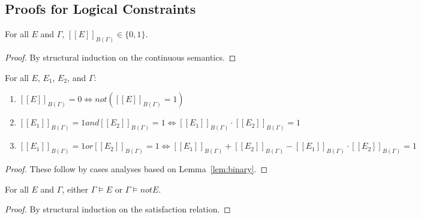 \documentclass[acmsmall,nonacm]{acmart}\settopmatter{printfolios=true,printccs=false,printacmref=false}
\newcommand{\qqpi}[2]{[\![#2]\!]_{#1}}
\begin{document}
\subsection{Proofs for Logical Constraints}


\begin{lemma} \label{lem:binary}
    For all $E$ and $\Gamma$, $\qqpi{B(\Gamma)}{E} \in \{0,1\}$.
\end{lemma}

\begin{proof} %
    By structural induction on the continuous semantics.
\end{proof}


\begin{lemma}
For all $E$, $E_1$, $E_2$, and $\Gamma$:
\begin{enumerate}
    \item $\qqpi{B(\Gamma)}{E} = 0 \Leftrightarrow{} not (\qqpi{B(\Gamma)}{E} = 1)$
    \item $\qqpi{B(\Gamma)}{E_1} = 1 \mathrel{and} \qqpi{B(\Gamma)}{E_2} = 1 \Leftrightarrow{}  \qqpi{B(\Gamma)}{E_1} \cdot \qqpi{B(\Gamma)}{E_2} = 1$
    \item $\qqpi{B(\Gamma)}{E_1} = 1 \mathrel{or} \qqpi{B(\Gamma)}{E_2} = 1 \Leftrightarrow{}  \qqpi{B(\Gamma)}{E_1} + \qqpi{B(\Gamma)}{E_2} - \qqpi{B(\Gamma)}{E_1} \cdot \qqpi{B(\Gamma)}{E_2} = 1$
\end{enumerate}
\end{lemma}
\begin{proof}
  These follow by cases analyses based on Lemma~\ref{lem:binary}.
\end{proof}


\begin{lemma} \label{lem:models}
    For all $E$ and $\Gamma$, either $\Gamma \models E$ or $\Gamma \models{} \mathrel{not} E$.
\end{lemma}

\begin{proof}
    By structural induction on the satisfaction relation.
\end{proof}


\end{document}
